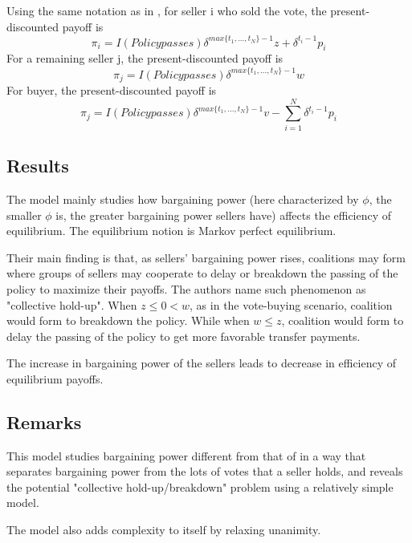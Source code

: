 \documentclass[ProjectGAZ]{subfiles}
\begin{document}
Using the same notation as in \cite{Xiao}, for seller i who sold the vote, the present-discounted payoff is
\begin{equation}
	\pi_i = I(Policy passes)\delta^{max\{t_1, ..., t_N\} - 1} z + \delta^{t_i-1}p_i 
\end{equation}
For a remaining seller j, the present-discounted payoff is 
\begin{equation}
	\pi_j =  I(Policy passes)\delta^{max\{t_1, ..., t_N\} - 1} w
\end{equation}
For buyer, the present-discounted payoff is 
\begin{equation}
	\pi_j =  I(Policy passes)\delta^{max\{t_1, ..., t_N\} - 1} v - \sum_{i=1}^{N}\delta^{t_i-1}p_i
\end{equation}

\subsection{Results}\label{subsec:InO-Results}

The model mainly studies how bargaining power (here characterized by $\phi$, the smaller $\phi$ is, the greater bargaining power sellers have) affects the efficiency of equilibrium. The equilibrium notion is Markov perfect equilibrium.

Their main finding is that, as sellers' bargaining power rises, coalitions may form where groups of sellers may cooperate to delay or breakdown the passing of the policy to maximize their payoffs. The authors name such phenomenon as "collective hold-up". When $z \leq 0 < w$, as in the vote-buying scenario, coalition would form to breakdown the policy. While when $w \leq z$, coalition would form to delay the passing of the policy to get more favorable transfer payments.

The increase in bargaining power of the sellers leads to decrease in efficiency of equilibrium payoffs.


\subsection{Remarks}\label{subsec:InO-Remarks}

This model studies bargaining power different from that of \cite{Xiao} in a way that separates bargaining power from the lots of votes that a seller holds, and reveals the potential "collective hold-up/breakdown" problem using a relatively simple model. 

The model also adds complexity to itself by relaxing unanimity.
\end{document}
